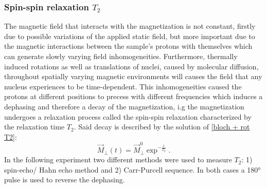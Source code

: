  \subsubsection{Spin-spin relaxation $T_2$}
The magnetic field that interacts with the magnetization is not constant, firstly due to possible variations of the applied static field, but more important due to the magnetic interactions between the sample's protons with themselves which can generate slowly varying field inhomogeneities. Furthermore, thermally induced rotations as well as translations of nuclei, caused by molecular diffusion, throughout spatially varying magnetic environments will causes the field that any nucleus experiences to be time-dependent. This inhomogeneities caused the protons at different positions to precess with different frequencies which induces a dephasing and therefore a decay of the magnetization, i.g the magnetization undergoes a relaxation process called the spin-spin relaxation characterized by the relaxation time $T_2$. Said decay is described by the solution of \ref{bloch + rot T2}:
\begin{equation}
\vec{M}_{\perp}(t)= \vec{M}_\perp^{0}\exp^{-\frac{t}{T_2}}.
\end{equation}
In the following experiment two different methods were used to measure $T_2$: 1) spin-echo/ Hahn echo method and 2) Carr-Purcell sequence. In both cases a 180° pulse is used to reverse the dephasing. 
